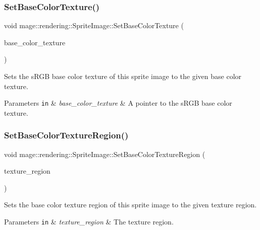 \subsubsection{\texorpdfstring{Set\+Base\+Color\+Texture()}{SetBaseColorTexture()}}
{\footnotesize\ttfamily void mage\+::rendering\+::\+Sprite\+Image\+::\+Set\+Base\+Color\+Texture (\begin{DoxyParamCaption}\item[{\hyperlink{namespacemage_1_1rendering_a6f3ae54f825328465b0cdde0f0de4a36}{Texture\+Ptr}}]{base\+\_\+color\+\_\+texture }\end{DoxyParamCaption})\hspace{0.3cm}{\ttfamily [noexcept]}}

Sets the s\+R\+GB base color texture of this sprite image to the given base color texture.


\begin{DoxyParams}[1]{Parameters}
\mbox{\tt in}  & {\em base\+\_\+color\+\_\+texture} & A pointer to the s\+R\+GB base color texture. \\
\hline
\end{DoxyParams}
\hypertarget{classmage_1_1rendering_1_1_sprite_image_a54b349a9f73c7d6f3ded4a3d1f3172bf}{}\label{classmage_1_1rendering_1_1_sprite_image_a54b349a9f73c7d6f3ded4a3d1f3172bf} 
\subsubsection{\texorpdfstring{Set\+Base\+Color\+Texture\+Region()}{SetBaseColorTextureRegion()}}
{\footnotesize\ttfamily void mage\+::rendering\+::\+Sprite\+Image\+::\+Set\+Base\+Color\+Texture\+Region (\begin{DoxyParamCaption}\item[{R\+E\+CT}]{texture\+\_\+region }\end{DoxyParamCaption})\hspace{0.3cm}{\ttfamily [noexcept]}}

Sets the base color texture region of this sprite image to the given texture region.


\begin{DoxyParams}[1]{Parameters}
\mbox{\tt in}  & {\em texture\+\_\+region} & The texture region. \\
\hline
\end{DoxyParams}
\hypertarget{classmage_1_1rendering_1_1_sprite_image_a5b0a8abc53768cce82c3c2f8f1a96745}{}\label{classmage_1_1rendering_1_1_sprite_image_a5b0a8abc53768cce82c3c2f8f1a96745} 
